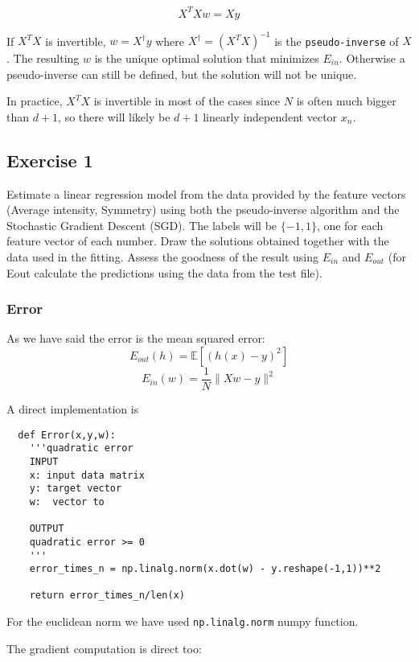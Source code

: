 $$X^TXw = X y$$

If $X^TX$ is invertible, $w = X^\dagger y$ where $X^\dagger = (X^T X)^{-1}$ is the \texttt{pseudo-inverse} of $X$. The resulting $w$ is the unique optimal solution that minimizes $E_{in}$.  Otherwise a pseudo-inverse can still be defined, but the solution will not be unique.

In practice, $X^TX$ is invertible in most of the cases since $N$ is often much bigger than $d+1$, so there will likely be $d+1$ linearly independent vector $x_n$.



\subsection{Exercise 1}

Estimate a linear regression model from the data provided by the
feature vectors (Average intensity, Symmetry)
using both the pseudo-inverse algorithm and the Stochastic Gradient Descent (SGD).
The labels will be $\{-1,1\}$,
one for each feature vector of each number.
Draw the solutions obtained together with the data used in the fitting.
Assess the goodness of the result using $E_{in}$ and $E_{out}$
(for Eout calculate the predictions using the data from the test file).



\subsubsection{Error}


As we have said the error is the mean squared error:
$$E_{out}(h) = \mathbb E [(h(x) -y)^2]$$
 $$E_{in}(w)  = \frac{1}{N} \| Xw -y \|^2$$

A direct implementation is

\begin{verbatim}
  def Error(x,y,w):
    '''quadratic error 
    INPUT
    x: input data matrix
    y: target vector
    w:  vector to 

    OUTPUT
    quadratic error >= 0
    '''
    error_times_n = np.linalg.norm(x.dot(w) - y.reshape(-1,1))**2
  
    return error_times_n/len(x)

  \end{verbatim}

  

  For the euclidean norm we have used \texttt{np.linalg.norm} \cite{norm} numpy function.

  The gradient computation is direct too:

